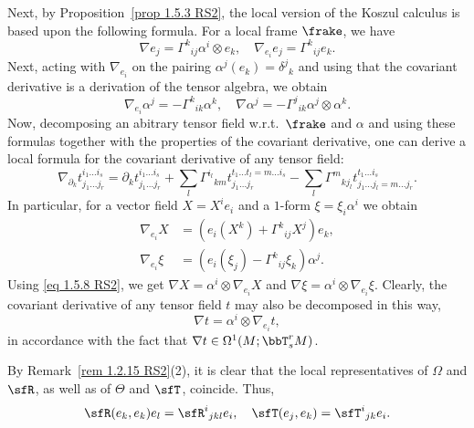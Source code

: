 Next, by Proposition~\ref{prop 1.5.3 RS2}, the local version of the Koszul calculus is based upon the following formula. For a local frame $\frake$, we have 
\[\nabla e_j=\varGamma^k{}_{ij}\alpha^i\otimes e_k, \quad \nabla_{e_i}e_j=\varGamma^k{}_{ij}e_k. \label{eq 2.1.45/46 RS2}\]
Next, acting with $\nabla_{e_i}$ on the pairing $\alpha^j(e_k)=\delta^j{}_k$ and using that the covariant derivative is a derivation of the tensor algebra, we obtain 
\[\nabla_{e_i}\alpha^j=-\varGamma^k{}_{ik}\alpha^k,\quad \nabla\alpha^j=-\varGamma^j{}_{ik}\alpha^j\otimes\alpha^k.\label{eq 2.1.47/48 RS2}\]
Now, decomposing an abitrary tensor field w.r.t.\ $\frake$ and $\alpha$ and using these formulas together with the properties of the covariant derivative, one can derive a local formula for the covariant derivative of any tensor field:
\[\nabla_{\partial_k}t_{j_1\ldots j_r}^{i_1\ldots i_s}=\partial_kt_{j_1\ldots j_r}^{i_1\ldots i_s}+\sum_l\varGamma^{i_l}{}_{km}t_{j_1\ldots j_r}^{t_1\ldots t_l=m\ldots i_s}-
\sum_l\varGamma^{m}{}_{kj_l}t_{j_1\ldots j_l=m\ldots  j_r}^{t_1\ldots i_s}.
\]
In particular, for a vector field $X=X^i e_i$ and a $1$-form $\xi=\xi_i\alpha^i$ we obtain 
\begin{align}
    \nabla_{e_i}X&=(e_i(X^k)+\varGamma^k{}_{ij}X^j)e_k,\label{eq 2.1.49 RS2}\\
    \nabla_{e_i}\xi&=(e_i(\xi_j)-\varGamma^k{}_{ij}\xi_k)\alpha^j.\label{eq 2.1.50 RS2}
\end{align}
Using \eqref{eq 1.5.8 RS2}, we get $\nabla X=\alpha^i\otimes\nabla_{e_i}X$ and $\nabla\xi=\alpha^i\otimes\nabla_{e_i}\xi$. Clearly, the covariant derivative of any tensor field $t$ may also be decomposed in this way,
\[\nabla t=\alpha^i\otimes \nabla_{e_i} t,\]
in accordance with the fact that $\nabla t\in\Omega^1(M;\bbT^r_s M)$.

\begin{rem}\label{rem 2.1.28 RS2}
    By Remark~\ref{rem 1.2.15 RS2}(2), it is clear that the local representatives of $\Omega$ and $\sfR$, as well as of $\Theta$ and $\sfT$, coincide. Thus,
    \[\sfR(e_k,e_k)e_l=\sfR^i{}_{jkl}e_i,\quad \sfT(e_j,e_k)=\sfT^i{}_{jk}e_i.\]
\end{rem}

